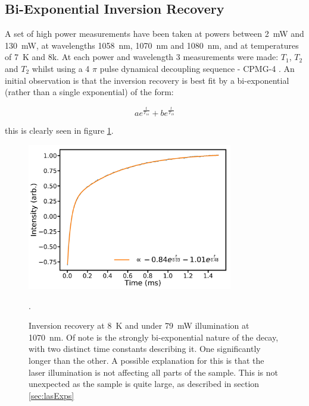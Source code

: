 \subsection{Bi-Exponential Inversion Recovery}

A set of high power measurements have been taken at powers between 2~mW and 130~mW, at wavelengths 1058~nm, 1070~nm and 1080~nm, and at temperatures of 7~K and 8k.
At each power and wavelength 3 measurements were made: $T_1$, $T_2$ and $T_2$ whilst using a 4 $\pi$ pulse dynamical decoupling sequence - CPMG-4 \cite{Carr1954}.
An initial observation is that the inversion recovery is best fit by a bi-exponential (rather than a single exponential) of the form:

\begin{equation}
a e^{\frac{t}{T_{1a}}} + b e^{\frac{t}{T_{1b}}}
\end{equation}

this is clearly seen in figure \ref{fig:biexpDec}.

\begin{figure}
\centering
\includegraphics[width=0.8\textwidth]{Figures/T1_biExp.pdf}
\caption[Inversion recovery under laser illumination]{Inversion recovery at 8~K and under 79~mW illumination at 1070~nm. Of note is the strongly bi-exponential nature of the decay, with two distinct time constants describing it. One significantly longer than the other. A possible explanation for this is that the laser illumination is not affecting all parts of the sample. This is not unexpected as the sample is quite large, as described in section \ref{sec:lasExps}}. 
\label{fig:biexpDec}
\end{figure}

